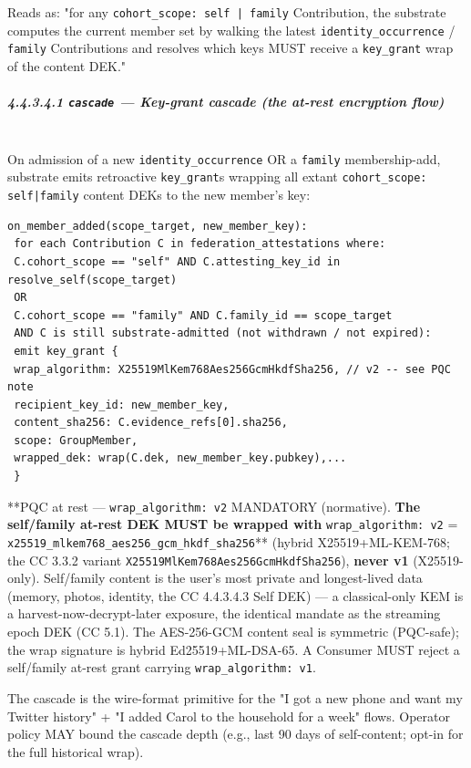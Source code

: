 \documentclass[11pt]{article}
\begin{document}
Reads as: "for any \texttt{cohort\_scope: self | family} Contribution, the substrate computes the current member set by walking the latest \texttt{identity\_occurrence} / \texttt{family} Contributions and resolves which keys MUST receive a \texttt{key\_grant} wrap of the content DEK."


\subparagraph{4.4.3.4.1 \texttt{cascade} — Key-grant cascade (the at-rest encryption flow)}\mbox{}\\


On admission of a new \texttt{identity\_occurrence} OR a \texttt{family} membership-add, substrate emits retroactive \texttt{key\_grant}s wrapping all extant \texttt{cohort\_scope: self|family} content DEKs to the new member's key:


\begin{lstlisting}
on_member_added(scope_target, new_member_key):
 for each Contribution C in federation_attestations where:
 C.cohort_scope == "self" AND C.attesting_key_id in resolve_self(scope_target)
 OR
 C.cohort_scope == "family" AND C.family_id == scope_target
 AND C is still substrate-admitted (not withdrawn / not expired):
 emit key_grant {
 wrap_algorithm: X25519MlKem768Aes256GcmHkdfSha256, // v2 -- see PQC note
 recipient_key_id: new_member_key,
 content_sha256: C.evidence_refs[0].sha256,
 scope: GroupMember,
 wrapped_dek: wrap(C.dek, new_member_key.pubkey),...
 }
\end{lstlisting}

**PQC at rest — \texttt{wrap\_algorithm: v2} MANDATORY (normative).\textbf{ The self/family at-rest DEK MUST be wrapped with }\texttt{wrap\_algorithm: v2} = \texttt{x25519\_mlkem768\_aes256\_gcm\_hkdf\_sha256}** (hybrid X25519+ML-KEM-768; the CC 3.3.2 variant \texttt{X25519MlKem768Aes256GcmHkdfSha256}), \textbf{never v1} (X25519-only). Self/family content is the user's most private and longest-lived data (memory, photos, identity, the CC 4.4.3.4.3 Self DEK) — a classical-only KEM is a harvest-now-decrypt-later exposure, the identical mandate as the streaming epoch DEK (CC 5.1). The AES-256-GCM content seal is symmetric (PQC-safe); the wrap signature is hybrid Ed25519+ML-DSA-65. A Consumer MUST reject a self/family at-rest grant carrying \texttt{wrap\_algorithm: v1}.


The cascade is the wire-format primitive for the "I got a new phone and want my Twitter history" + "I added Carol to the household for a week" flows. Operator policy MAY bound the cascade depth (e.g., last 90 days of self-content; opt-in for the full historical wrap).
\end{document}
